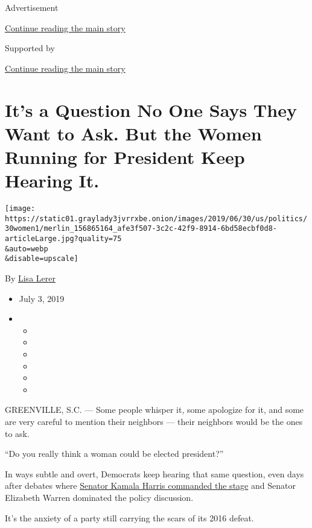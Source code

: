 Advertisement

\protect\hyperlink{after-top}{Continue reading the main story}

Supported by

\protect\hyperlink{after-sponsor}{Continue reading the main story}

\hypertarget{its-a-question-no-one-says-they-want-to-ask-but-the-women-running-for-president-keep-hearing-it}{%
\section{It's a Question No One Says They Want to Ask. But the Women
Running for President Keep Hearing
It.}\label{its-a-question-no-one-says-they-want-to-ask-but-the-women-running-for-president-keep-hearing-it}}

\texttt{[image: https://static01.graylady3jvrrxbe.onion/images/2019/06/30/us/politics/30women1/merlin\_156865164\_afe3f507-3c2c-42f9-8914-6bd58ecbf0d8-articleLarge.jpg?quality=75\\\&auto=webp\\\&disable=upscale]}

By \href{https://www.nytimes3xbfgragh.onion/by/lisa-lerer}{Lisa Lerer}

\begin{itemize}
\item
  July 3, 2019
\item
  \begin{itemize}
  \item
  \item
  \item
  \item
  \item
  \item
  \end{itemize}
\end{itemize}

GREENVILLE, S.C. --- Some people whisper it, some apologize for it, and
some are very careful to mention their neighbors --- their neighbors
would be the ones to ask.

``Do you really think a woman could be elected president?''

In ways subtle and overt, Democrats keep hearing that same question,
even days after debates where
\href{https://www.nytimes3xbfgragh.onion/2019/06/27/us/politics/kamala-harris-busing-joe-biden.html}{Senator
Kamala Harris commanded the stage} and Senator Elizabeth Warren
dominated the policy discussion.

It's the anxiety of a party still carrying the scars of its 2016 defeat.

